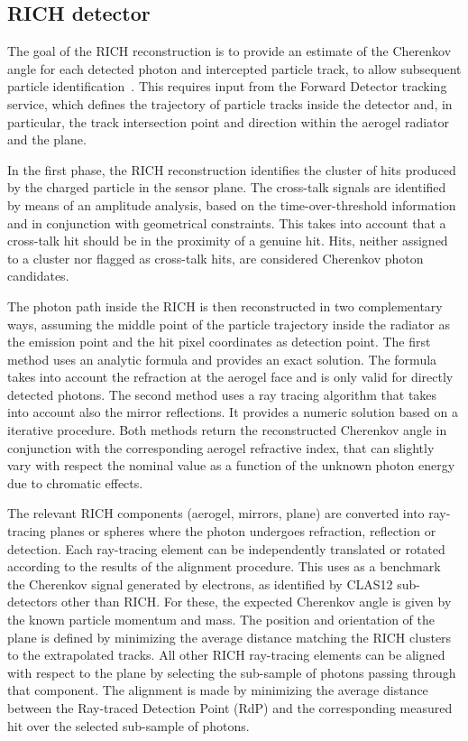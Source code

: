 \subsection{RICH detector}

The goal of the RICH reconstruction is to provide an estimate of the Cherenkov angle for each detected photon and intercepted particle track, to allow subsequent particle identification~\cite{rich-nim}. This requires input from the Forward Detector tracking service, which  defines the trajectory of particle tracks inside the detector and, in particular, the track intersection point and direction within the aerogel radiator and the \MaPMT plane. 

In the first phase, the RICH reconstruction identifies the cluster of hits produced by the charged particle in the sensor plane. The cross-talk signals are identified by means of an amplitude analysis, based on the time-over-threshold information and in conjunction with geometrical constraints. This takes into account that a cross-talk hit should be in the proximity of a genuine hit. Hits, neither assigned to a cluster nor flagged as cross-talk hits, are considered Cherenkov photon candidates. 

The photon path inside the RICH is then reconstructed in two complementary ways, assuming the middle point of the particle trajectory inside the radiator as the emission point and the hit pixel coordinates as detection point. The first method uses an analytic formula and provides an exact solution. The formula takes into account the refraction at the aerogel face and is only valid for directly detected photons. The second method uses a ray tracing algorithm that takes into account also the mirror reflections. It provides a numeric solution based on a iterative procedure. Both methods return the reconstructed Cherenkov angle in conjunction with the corresponding aerogel refractive index, that can slightly vary with respect the nominal value as a function of the unknown photon energy due to chromatic effects. 

The relevant RICH components (aerogel, mirrors, \MaPMT plane) are converted into ray-tracing planes or spheres where the photon undergoes refraction, reflection or detection. Each ray-tracing element can be independently translated or rotated according to the results of the alignment procedure. This uses as a benchmark the Cherenkov signal generated by electrons, as identified by CLAS12 sub-detectors other than RICH. For these, the expected Cherenkov angle is given by the known particle momentum and mass. The position and orientation of the \MaPMT plane is defined by minimizing the average distance matching the RICH clusters to the extrapolated tracks. All other RICH ray-tracing elements can be aligned with respect to the \MaPMT plane by selecting the sub-sample of photons passing through that component. The alignment is made by minimizing the average distance between the Ray-traced Detection Point (RdP) and the corresponding measured \MaPMT hit over the selected sub-sample of photons.

